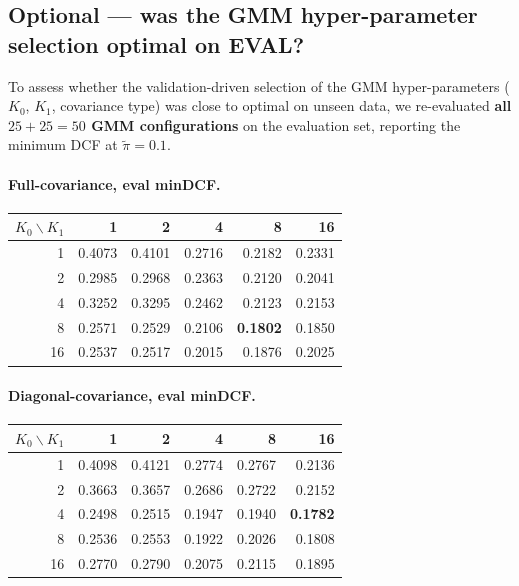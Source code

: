 \documentclass[11pt,a4paper]{article}
\begin{document}
\subsection{Optional --- was the GMM hyper-parameter selection
optimal on EVAL?}

To assess whether the validation-driven selection of the GMM
hyper-parameters ($K_0$, $K_1$, covariance type) was close to
optimal on unseen data, we re-evaluated \textbf{all $25 + 25 = 50$
GMM configurations} on the evaluation set, reporting the minimum
DCF at $\tilde{\pi}=0.1$.

\paragraph{Full-covariance, eval minDCF.}

\begin{table}[H]
\centering
\begin{tabular}{rrrrrr}
\toprule
$K_0\backslash K_1$ & 1 & 2 & 4 & 8 & 16 \\
\midrule
1  & 0.4073 & 0.4101 & 0.2716 & 0.2182 & 0.2331 \\
2  & 0.2985 & 0.2968 & 0.2363 & 0.2120 & 0.2041 \\
4  & 0.3252 & 0.3295 & 0.2462 & 0.2123 & 0.2153 \\
8  & 0.2571 & 0.2529 & 0.2106 & \textbf{0.1802} & 0.1850 \\
16 & 0.2537 & 0.2517 & 0.2015 & 0.1876 & 0.2025 \\
\bottomrule
\end{tabular}
\end{table}

\paragraph{Diagonal-covariance, eval minDCF.}

\begin{table}[H]
\centering
\begin{tabular}{rrrrrr}
\toprule
$K_0\backslash K_1$ & 1 & 2 & 4 & 8 & 16 \\
\midrule
1  & 0.4098 & 0.4121 & 0.2774 & 0.2767 & 0.2136 \\
2  & 0.3663 & 0.3657 & 0.2686 & 0.2722 & 0.2152 \\
4  & 0.2498 & 0.2515 & 0.1947 & 0.1940 & \textbf{0.1782} \\
8  & 0.2536 & 0.2553 & 0.1922 & 0.2026 & 0.1808 \\
16 & 0.2770 & 0.2790 & 0.2075 & 0.2115 & 0.1895 \\
\bottomrule
\end{tabular}
\end{table}
\end{document}
